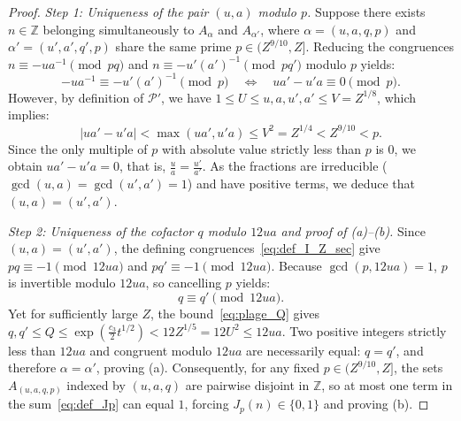 \documentclass[11pt, a4paper]{article}
\theoremstyle{plain}
\theoremstyle{definition}
\newcommand{\Z}{\mathbb{Z}}
\begin{document}
\begin{proof}
\emph{Step 1: Uniqueness of the pair $(u,a)$ modulo $p$.}
Suppose there exists $n \in \Z$ belonging simultaneously to $A_\alpha$ and $A_{\alpha'}$, where $\alpha = (u,a,q,p)$ and $\alpha' = (u',a',q',p)$ share the same prime $p \in (Z^{9/10}, Z]$. Reducing the congruences $n \equiv -u a^{-1} \pmod{pq}$ and $n \equiv -u'(a')^{-1} \pmod{pq'}$ modulo $p$ yields:
\[
-u a^{-1} \equiv -u'(a')^{-1} \pmod p \quad \Longleftrightarrow \quad ua' - u'a \equiv 0 \pmod p.
\]
However, by definition of $\mathcal{P}'$, we have $1 \le U \le u, a, u', a' \le V = Z^{1/8}$, which implies:
\[
|ua' - u'a| < \max(ua', u'a) \le V^2 = Z^{1/4} < Z^{9/10} < p.
\]
Since the only multiple of $p$ with absolute value strictly less than $p$ is $0$, we obtain $ua' - u'a = 0$, that is, $\frac{u}{a} = \frac{u'}{a'}$. As the fractions are irreducible ($\gcd(u,a) = \gcd(u',a') = 1$) and have positive terms, we deduce that $(u,a) = (u',a')$.

\medskip\noindent\emph{Step 2: Uniqueness of the cofactor $q$ modulo $12ua$ and proof of (a)--(b).}
Since $(u,a) = (u',a')$, the defining congruences~\eqref{eq:def_I_Z_sec} give $pq \equiv -1 \pmod{12ua}$ and $pq' \equiv -1 \pmod{12ua}$. Because $\gcd(p, 12ua) = 1$, $p$ is invertible modulo $12ua$, so cancelling $p$ yields:
\[
q \equiv q' \pmod{12ua}.
\]
Yet for sufficiently large $Z$, the bound~\eqref{eq:plage_Q} gives $q, q' \le Q \le \exp(\frac{c_3}{2} t^{1/2}) < 12 Z^{1/5} = 12 U^2 \le 12ua$. Two positive integers strictly less than $12ua$ and congruent modulo $12ua$ are necessarily equal: $q = q'$, and therefore $\alpha = \alpha'$, proving (a). Consequently, for any fixed $p \in (Z^{9/10}, Z]$, the sets $A_{(u,a,q,p)}$ indexed by $(u,a,q)$ are pairwise disjoint in $\Z$, so at most one term in the sum~\eqref{eq:def_Jp} can equal $1$, forcing $J_p(n) \in \{0, 1\}$ and proving (b).


\end{proof}
\end{document}
